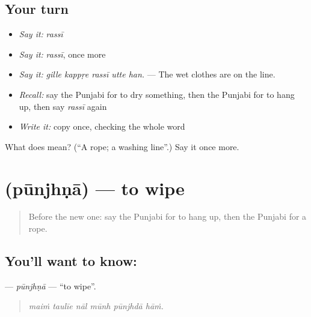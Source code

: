 \subsection*{Your turn}
\begin{itemize}
\raggedright
  \item \emph{Say it:} \emph{rassī}
  \item \emph{Say it:} \emph{rassī}, once more
  \item \emph{Say it:} \emph{gille kappṛe rassī utte han.} — The wet clothes are on the line.
  \item \emph{Recall:} say the Punjabi for to dry something, then the Punjabi for to hang up, then say \emph{rassī} again
  \item \emph{Write it:} copy \textbf{} once, checking the whole word
\end{itemize}

\begin{tcolorbox}[breakable,colback=teal!4,colframe=teal!35!black,title={Before you move on}]
What does  mean? (\textquotedblleft{}A rope; a washing line\textquotedblright{}.) Say it once more.
\end{tcolorbox}
\section[\texorpdfstring{\pa{ਪੂੰਝਣਾ} (pūnjhṇā)}{ਪੂੰਝਣਾ (pūnjhṇā)}]{ (pūnjhṇā) — to wipe}

\label{lesson:PA-C228-punjhna}



\begin{quote}
Before the new one: say the Punjabi for to hang up, then the Punjabi for a rope.
\end{quote}

\subsection*{You'll want to know: }
\textbf{} — \emph{pūnjhṇā} — \textquotedblleft{}to wipe\textquotedblright{}.

\begin{quote}
     
\end{quote}

\begin{quote}
\emph{maiṁ taulīe nāl mūnh pūnjhdā hāṁ.}
\end{quote}

